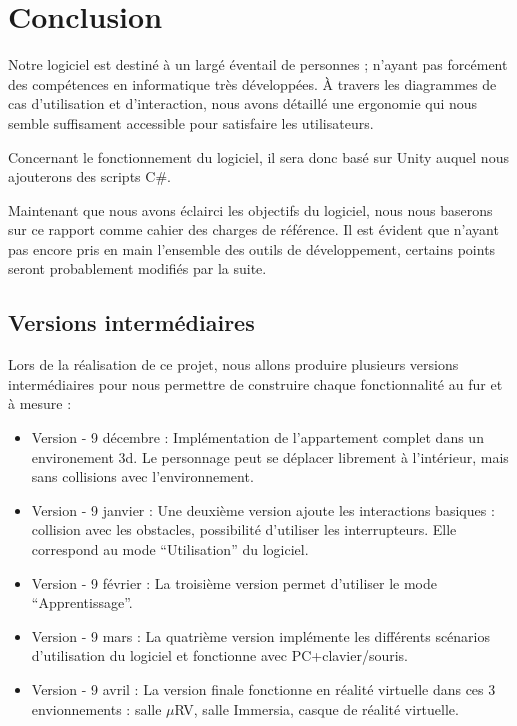 \section{Conclusion}
Notre logiciel est destiné à un largé éventail de personnes ; n'ayant pas forcément des compétences en informatique très développées.
\`A travers les diagrammes de cas d'utilisation et d'interaction, nous avons détaillé une ergonomie qui nous semble suffisament accessible pour satisfaire les utilisateurs.

Concernant le fonctionnement du logiciel, il sera donc basé sur Unity auquel nous ajouterons des scripts C\#.

Maintenant que nous avons éclairci les objectifs du logiciel, nous nous baserons sur ce rapport comme cahier des charges de référence. Il est évident que n'ayant pas encore pris en main l'ensemble des outils de développement, certains points seront probablement modifiés par la suite.



\subsection{Versions intermédiaires}
Lors de la réalisation de ce projet, nous allons produire plusieurs versions intermédiaires pour nous permettre de construire chaque fonctionnalité au fur et à mesure :
\begin{itemize}
  \item Version  - 9 décembre : Implémentation de l'appartement complet dans un environement 3d. Le personnage peut se déplacer librement à l'intérieur, mais sans collisions avec l'environnement.
  \item Version  - 9 janvier : Une deuxième version ajoute les interactions basiques : collision avec les obstacles, possibilité d'utiliser les interrupteurs. Elle correspond au mode \enquote{Utilisation} du logiciel.
  \item Version  - 9 février :  La troisième version permet d'utiliser le mode \enquote{Apprentissage}.
  \item Version  - 9 mars : La quatrième version implémente les différents scénarios d'utilisation du logiciel et fonctionne avec PC+clavier/souris.
  \item Version  - 9 avril : La version finale fonctionne en réalité virtuelle dans ces 3 envionnements : salle $\mu$RV, salle Immersia, casque de réalité virtuelle.
\end{itemize}
